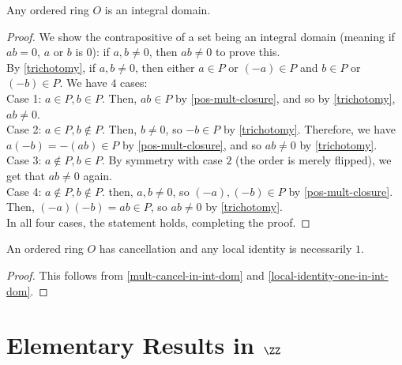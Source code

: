 \begin{theorem}\label{ordered-rings-int-dom}
Any ordered ring $O$ is an integral domain.
\end{theorem}
\begin{proof}
    We show the contrapositive of a set being an integral domain (meaning if $ab = 0$, $a$ or $b$ is $0$): if $a, b \neq 0$, then $ab \neq 0$ to prove this. \\

    By \ref{trichotomy}, if $a,b \neq 0$, then either $a \in P$ or $(-a) \in P$ and $b \in P$ or $(-b) \in P$. We have $4$ cases: \\
    
    Case 1: $a \in P, b \in P$. Then, $ab \in P$ by \ref{pos-mult-closure}, and so by \ref{trichotomy}, $ab \neq 0$. \\
    
    Case 2: $a \in P, b \notin P$. Then, $b \neq 0$, so $-b \in P$ by \ref{trichotomy}. Therefore, we have $a(-b) = -(ab) \in P$ by \ref{pos-mult-closure}, and so $ab \neq 0$ by \ref{trichotomy}. \\
    
    Case 3: $a \notin P, b \in P$. By symmetry with case $2$ (the order is merely flipped), we get that $ab \neq 0$ again. \\
    
    Case 4: $a \notin P, b \notin P$. then, $a, b \neq 0$, so $(-a), (-b) \in P$ by \ref{pos-mult-closure}. Then, $(-a)(-b) = ab \in P$, so $ab \neq 0$ by \ref{trichotomy}. \\

    In all four cases, the statement holds, completing the proof.
\end{proof}

\begin{corollary}
An ordered ring $O$ has cancellation and any local identity is necessarily $1$.
\end{corollary}

\begin{proof}
    This follows from \ref{mult-cancel-in-int-dom} and \ref{local-identity-one-in-int-dom}. 
\end{proof}

    
\newpage

\section{Elementary Results in $\ZZ$}

